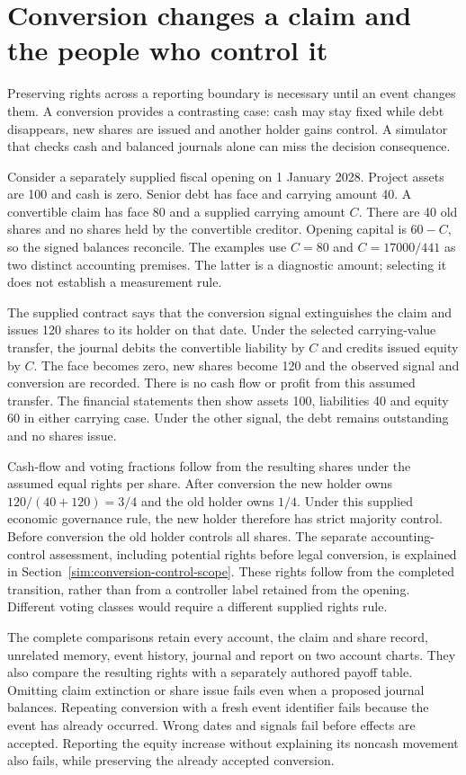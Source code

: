 
\section{Conversion changes a claim and the people who control it}
\label{sim:conversion-book-rights}
Preserving rights across a reporting boundary is necessary until an event
changes them. A conversion provides a contrasting case: cash may stay fixed
while debt disappears, new shares are issued and another holder gains
control. A simulator that checks cash and balanced journals alone can miss
the decision consequence.

Consider a separately supplied fiscal opening on 1 January 2028. Project
assets are 100 and cash is zero. Senior debt has face and carrying amount
40. A convertible claim has face 80 and a supplied carrying amount $C$.
There are 40 old shares and no shares held by the convertible creditor.
Opening capital is $60-C$, so the signed balances reconcile. The examples
use $C=80$ and $C=17000/441$ as two distinct accounting premises. The latter
is a diagnostic amount; selecting it does not establish a measurement rule.

The supplied contract says that the conversion signal extinguishes the
claim and issues 120 shares to its holder on that date. Under the selected
carrying-value transfer, the journal debits the convertible liability by
$C$ and credits issued equity by $C$. The face becomes zero, new shares
become 120 and the observed signal and conversion are recorded. There is
no cash flow or profit from this assumed transfer. The financial statements
then show assets 100, liabilities 40 and equity 60 in either carrying case.
Under the other signal, the debt remains outstanding and no shares issue.

Cash-flow and voting fractions follow from the resulting shares under the
assumed equal rights per share. After conversion the new holder owns
$120/(40+120)=3/4$ and the old holder owns $1/4$. Under this supplied economic governance rule, the new holder therefore
has strict majority control. Before conversion the old holder controls all
shares. The separate accounting-control assessment, including potential
rights before legal conversion, is explained in
Section~\ref{sim:conversion-control-scope}. These rights follow from the completed transition, rather than
from a controller label retained from the opening. Different voting classes
would require a different supplied rights rule.

The complete comparisons retain every account, the claim and share record,
unrelated memory, event history, journal and report on two account charts.
They also compare the resulting rights with a separately authored payoff
table. Omitting claim extinction or share issue fails even when a proposed
journal balances. Repeating conversion with a fresh event identifier fails
because the event has already occurred. Wrong dates and signals fail before
effects are accepted. Reporting the equity increase without explaining its
noncash movement also fails, while preserving the already accepted conversion.

